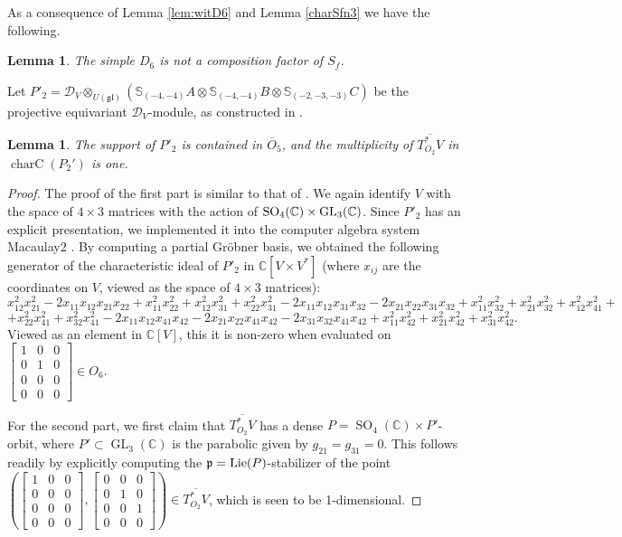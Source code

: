 \documentclass[11pt,reqno]{amsart}
\newcommand{\D}{\mathcal{D}}
\newcommand{\oo}{\otimes}
\newcommand{\bS}{\mathbb{S}}
\newcommand{\tn}{\textnormal}
\newcommand{\C}{\mathbb{C}}
\newcommand{\charC}{\operatorname{charC}}
\newcommand{\GL}{\operatorname{GL}}
\newcommand{\ol}[1]{\overline{#1}}
\newcommand{\op}[1]{\operatorname{#1}}
\newtheorem{lemma}[theorem]{Lemma}
\numberwithin{equation}{section}
\begin{document}
As a consequence of Lemma \ref{lem:witD6} and Lemma \ref{charSfn3} we have the following.
\begin{lemma}\label{D6S0fn3}
The simple $D_6$ is not a composition factor of $S_f$. 
\end{lemma}


Let $P'_2= \D_V \otimes_{U(\mathfrak{gl})} (\bS_{(-4,-4)}A\oo \bS_{(-4,-4)}B\oo \bS_{(-2,-3,-3)}C)$ be the projective equivariant $\D_V$-module, as constructed in \cite[Section 2.1]{lHorincz2019categories}.
\begin{lemma}\label{lem:P2char}
The support of $P'_2$ is contained in $\ol{O}_5$, and the multiplicity of $\ol{T_{O_2}^* V}$ in $\charC(P_2')$ is one.
\end{lemma}
\begin{proof}
The proof of the first part is similar to that of \cite[Lemma 5.14]{lHorincz2019categories}. We again identify $V$ with the space of $4\times 3$ matrices with the action of $\tn{SO}_{4}(\C) \times \GL_3(\C)$. Since $P'_2$ has an explicit presentation, we implemented it into the computer algebra system Macaulay2 \cite{M2}. By computing a partial Gr\"obner basis, we obtained the following generator of the characteristic ideal of $P'_2$ in $\C[V \times V^*]$ (where $x_{ij}$ are the coordinates on $V$, viewed as the space of $4\times 3$ matrices):
\[
x_{12}^2x_{21}^2-2x_{11}x_{12}x_{21}x_{22}+x_{11}^2x_{22}^2+x_{12}^2x_{31}^2+x_{22}^2x_{31}^2-2x_{11}x_{12}x_{31}x_{32}-2x_{21}x_{22}x_{31}x_{32}+x_{11}^2x_{32}^2+x_{21}^2x_{32}^2+x_{12}^2x_{41}^2+\]
\[+x_{22}^2x_{41}^2+x_{32}^2x_{41}^2-2x_{11}x_{12}x_{41}x_{42}-2x_{21}x_{22}x_{41}x_{42}-2x_{31}x_{32}x_{41}x_{42}+x_{11}^2x_{42}^2+x_{21}^2x_{42}^2+x_{31}^2x_{42}^2.\]
Viewed as an element in $\C[V]$, this it is non-zero when evaluated on  $\begin{bmatrix} 1 & 0 & 0 \\ 0 & 1 & 0 \\ 0 & 0 & 0 \\ 0 & 0 & 0 \end{bmatrix}  \in O_6$.

For the second part, we first claim that $\ol{T_{O_2}^* V}$ has a dense $P=\op{SO}_4(\C)\times P'$-orbit, where $P'\subset \GL_3(\C)$ is the parabolic given by $g_{21}=g_{31}=0$. This follows readily by explicitly computing the $\mathfrak{p}=\tn{Lie}(P)$-stabilizer of the point $\left(\begin{bmatrix} 1 & 0 & 0 \\ 0 & 0 & 0 \\ 0 & 0 & 0 \\ 0 & 0 & 0 \end{bmatrix}, \begin{bmatrix} 0 & 0 & 0 \\ 0 & 1 & 0 \\ 0 & 0 & 1 \\ 0 & 0 & 0 \end{bmatrix}\right) \in \ol{T_{O_2}^* V}$, which is seen to be 1-dimensional. 


\end{proof}
\end{document}
